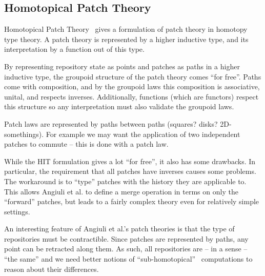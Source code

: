 \subsection{Homotopical Patch Theory}
Homotopical Patch Theory~\cite{Angiuli2016} gives a formulation of patch theory
in homotopy type theory. A patch theory is represented by a higher
inductive type, and its interpretation by a function out of this type.

By representing repository state as points and patches as paths in a higher
inductive type, the groupoid structure of the patch theory comes ``for free''.
Paths come with composition, and by the groupoid laws this composition is
associative, unital, and respects inverses. Additionally, functions (which are functors)
respect this structure so any interpretation must also validate the groupoid
laws.

Patch laws are represented by paths between paths (squares? disks?
2D-somethings). For example we may want the application of two independent
patches to commute -- this is done with a patch law.

While the HIT formulation gives a lot ``for free'', it also has some drawbacks.
In particular, the requirement that all patches have inverses causes some
problems. The workaround is to ``type'' patches with the history they are
applicable to. This allows Angiuli et al. to define a merge operation in terms
on only the ``forward'' patches, but leads to a fairly complex theory even for
relatively simple settings.

An interesting feature of Angiuli et al.'s patch theories is that the type of
repositories must be contractible. Since patches are represented by paths, any
point can be retracted along them. As such, all repositories are -- in a sense
-- ``the same'' and we need better notions of
``sub-homotopical''~\cite{Angiuli2016} computations to reason about their differences.